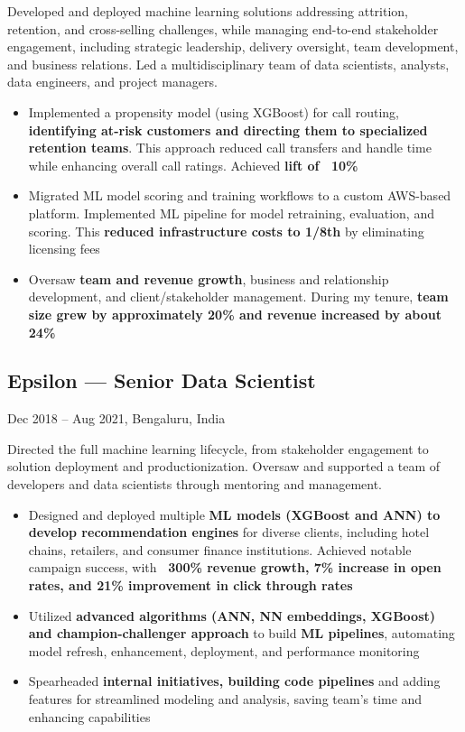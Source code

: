 \documentclass[letterpaper,10pt]{article}
\begin{document}
  Developed and deployed machine learning solutions addressing attrition, retention, and cross-selling challenges, while managing end-to-end stakeholder engagement, including strategic leadership, delivery oversight, team development, and business relations. Led a multidisciplinary team of data scientists, analysts, data engineers, and project managers.
  \begin{itemize}[leftmargin=1em]
      \item Implemented a propensity model (using XGBoost) for call routing, \textbf{identifying at-risk customers and directing them to specialized retention teams}. This approach reduced call transfers and handle time while enhancing overall call ratings. Achieved \textbf{lift of ~10\%}
      \item Migrated ML model scoring and training workflows to a custom AWS-based platform. Implemented ML pipeline for model retraining, evaluation, and scoring. This \textbf{reduced infrastructure costs to 1/8th} by eliminating licensing fees
      \item Oversaw \textbf{team and revenue growth}, business and relationship development, and client/stakeholder management. During my tenure, \textbf{team size grew by approximately 20\% and revenue increased by about 24\%}
  \end{itemize}

  \subsection*{Epsilon — Senior Data Scientist}
  Dec 2018 – Aug 2021, Bengaluru, India
  \newline {}
  
  Directed the full machine learning lifecycle, from stakeholder engagement to solution deployment and productionization. Oversaw and supported a team of developers and data scientists through mentoring and management.
  \begin{itemize}[leftmargin=1em]
      \item Designed and deployed multiple \textbf{ML models (XGBoost and ANN) to develop recommendation engines} for diverse clients, including hotel chains, retailers, and consumer finance institutions. Achieved notable campaign success, with \textbf{~300\% revenue growth, 7\% increase in open rates, and 21\% improvement in click through rates}
      \item Utilized \textbf{advanced algorithms (ANN, NN embeddings, XGBoost) and champion-challenger approach} to build \textbf{ML pipelines}, automating model refresh, enhancement, deployment, and performance monitoring
      \item Spearheaded \textbf{internal initiatives, building code pipelines} and adding features for streamlined modeling and analysis, saving team's time and enhancing capabilities
  \end{itemize}
\end{document}
